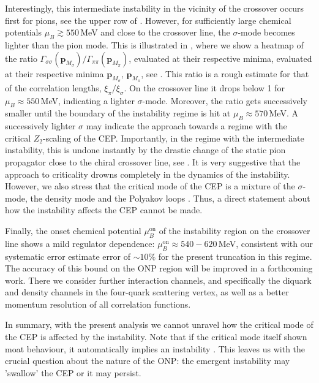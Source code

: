 \documentclass[10pt,prd,superscriptaddress,twocolumn]{revtex4-2}
\begin{document}
Interestingly, this intermediate instability in the vicinity of the crossover occurs first for pions, see the upper row of . However, for sufficiently large chemical potentials $\mu_B\gtrsim 550$\,MeV and close to the crossover line, the $\sigma$-mode becomes lighter than the pion mode. This is illustrated in , where we show a heatmap of the ratio $\Gamma_{\sigma\sigma}(\boldsymbol{p}_{M_\sigma})/\Gamma_{\pi\pi}(\boldsymbol{p}_{M_\pi})$, evaluated at their respective  minima, evaluated at their respective  minima $\boldsymbol{p}_{M_\sigma},\,\boldsymbol{p}_{M_\pi}$, see . This ratio is a rough estimate for that of the correlation lengths, $\xi_\pi/\xi_\sigma$. On the crossover line it drops below 1 for $\mu_B\approx 550$\,MeV, indicating a lighter $\sigma$-mode. Moreover, the ratio gets successively smaller until the boundary of the instability regime is hit at $\mu_B\approx 570 $\,MeV. 
A successively lighter $\sigma$ may indicate the approach towards a regime with the critical $Z_2$-scaling of the CEP. Importantly, in the regime with the intermediate instability, this is undone instantly by the drastic change of the static pion propagator close to the chiral crossover line, see  . It is very suggestive that the approach to criticality drowns completely in the dynamics of the instability. However,  
we also stress that the critical mode of the CEP is a mixture of the $\sigma$-mode, the density mode and the Polyakov loops \cite{Haensch:2023sig}.
Thus, a direct statement about how the instability affects the CEP cannot be made.

Finally, the onset chemical potential $\mu^\textrm{on}_B$ of the instability region on the crossover line shows a mild regulator dependence: $\mu^\textrm{on}_B \approx 540 - 620$\,MeV, consistent with our systematic error estimate  error of $\sim 10\%$ for the present truncation in this regime. The accuracy of this bound on the ONP region will be improved in a forthcoming work. There we consider further interaction channels, and specifically the diquark and density channels in the four-quark scattering vertex, as well as a better momentum resolution of all correlation functions. 

In summary, with the present analysis we cannot unravel how the critical mode of the CEP is affected by the instability. Note that if the critical mode itself shown moat behaviour, it automatically implies an instability \cite{Haensch:2023sig}. This leaves us with the crucial question about the nature of the ONP: the emergent instability may 'swallow' the CEP or it may persist.  
\end{document}
